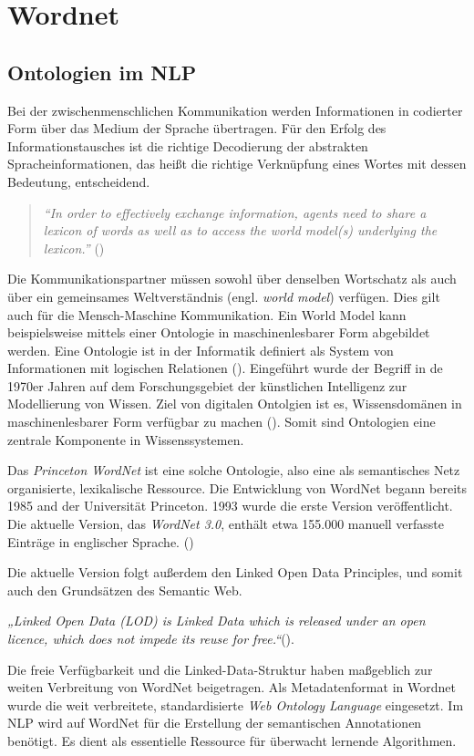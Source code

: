 \section{Wordnet}


\subsection{Ontologien im NLP}

Bei der zwischenmenschlichen Kommunikation werden Informationen in codierter Form über das Medium der Sprache übertragen. Für den Erfolg des Informationstausches ist die richtige Decodierung der abstrakten Spracheinformationen, das heißt die richtige Verknüpfung eines Wortes mit dessen Bedeutung, entscheidend. 
\begin{quote} \textit{"`In order to effectively exchange information, agents need to share a lexicon of words as well as to access the world model(s) underlying the lexicon."'} (\cite[vgl.][1]{OLTRAMANI})\end{quote} 
Die Kommunikationspartner müssen sowohl über denselben Wortschatz als auch über ein gemeinsames Weltverständnis (engl. \textit{world model}) verfügen. Dies gilt auch für die Mensch-Maschine Kommunikation. Ein World Model kann beispielsweise mittels einer Ontologie in maschinenlesbarer Form abgebildet werden. Eine Ontologie ist in der Informatik definiert als System von Informationen mit logischen Relationen (\cite[vgl.][1]{DUDEN}). Eingeführt wurde der Begriff in de 1970er Jahren auf dem Forschungsgebiet der künstlichen Intelligenz zur Modellierung von Wissen. Ziel von digitalen Ontolgien ist es, Wissensdomänen in maschinenlesbarer Form verfügbar zu machen (\cite[vgl.][7]{TACKE}). Somit sind Ontologien eine zentrale Komponente in Wissenssystemen. 
\par
Das \textit{Princeton WordNet} ist eine solche Ontologie, also eine als semantisches Netz organisierte, lexikalische Ressource. Die Entwicklung von WordNet begann bereits 1985 and der Universität Princeton. 1993 wurde die erste Version veröffentlicht. Die aktuelle Version, das \textit{WordNet 3.0}, enthält etwa 155.000 manuell verfasste Einträge in englischer Sprache. (\cite[vgl.][1]{PRINCETON})
\par
Die aktuelle Version folgt außerdem den Linked Open Data Principles, und somit auch den Grundsätzen des Semantic Web. 
\par
\textit{„Linked Open Data (LOD) is Linked Data which is released under an open licence, which does not impede its reuse for free.“}(\cite[vgl.][1]{BERNERS_LEE}). 
\par
Die freie Verfügbarkeit und die Linked-Data-Struktur haben maßgeblich zur weiten Verbreitung von WordNet beigetragen. Als Metadatenformat in Wordnet wurde die weit verbreitete, standardisierte \textit{Web Ontology Language} eingesetzt. Im \ac{NLP} wird auf WordNet für die Erstellung der semantischen Annotationen benötigt. Es dient als essentielle Ressource für überwacht lernende Algorithmen.
\par

